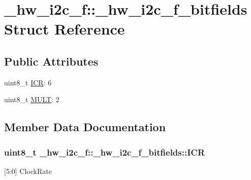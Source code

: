 \hypertarget{struct__hw__i2c__f_1_1__hw__i2c__f__bitfields}{}\section{\+\_\+hw\+\_\+i2c\+\_\+f\+:\+:\+\_\+hw\+\_\+i2c\+\_\+f\+\_\+bitfields Struct Reference}
\label{struct__hw__i2c__f_1_1__hw__i2c__f__bitfields}
\subsection*{Public Attributes}
\begin{DoxyCompactItemize}
\item 
uint8\+\_\+t \hyperlink{struct__hw__i2c__f_1_1__hw__i2c__f__bitfields_a2b0e93147bb311146bee7df9a00fb033}{I\+CR}\+: 6
\item 
uint8\+\_\+t \hyperlink{struct__hw__i2c__f_1_1__hw__i2c__f__bitfields_ae12f63f9f20a5283884bcd839e7285d5}{M\+U\+LT}\+: 2
\end{DoxyCompactItemize}


\subsection{Member Data Documentation}
\subsubsection[{\texorpdfstring{I\+CR}{ICR}}]{\setlength{\rightskip}{0pt plus 5cm}uint8\+\_\+t \+\_\+hw\+\_\+i2c\+\_\+f\+::\+\_\+hw\+\_\+i2c\+\_\+f\+\_\+bitfields\+::\+I\+CR}\hypertarget{struct__hw__i2c__f_1_1__hw__i2c__f__bitfields_a2b0e93147bb311146bee7df9a00fb033}{}\label{struct__hw__i2c__f_1_1__hw__i2c__f__bitfields_a2b0e93147bb311146bee7df9a00fb033}
\mbox{[}5\+:0\mbox{]} Clock\+Rate 
